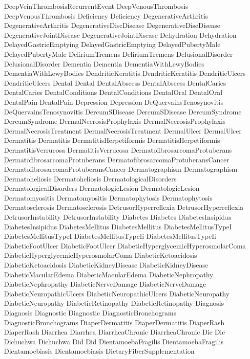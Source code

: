  DeepVeinThrombosisRecurrentEvent
 DeepVenousThrombosis
 DeepVenousThrombosis
 Deficiency
 Deficiency
 DegenerativeArthritis
 DegenerativeArthritis
 DegenerativeDiscDisease
 DegenerativeDiscDisease
 DegenerativeJointDisease
 DegenerativeJointDisease
 Dehydration
 Dehydration
 DelayedGastricEmptying
 DelayedGastricEmptying
 DelayedPubertyMale
 DelayedPubertyMale
 DeliriumTremens
 DeliriumTremens
 DelusionalDisorder
 DelusionalDisorder
 Dementia
 Dementia
 DementiaWithLewyBodies
 DementiaWithLewyBodies
 DendriticKeratitis
 DendriticKeratitis
 DendriticUlcers
 DendriticUlcers
 Dental
 Dental
 DentalAbscess
 DentalAbscess
 DentalCaries
 DentalCaries
 DentalConditions
 DentalConditions
 DentalOral
 DentalOral
 DentalPain
 DentalPain
 Depression
 Depression
 DeQuervainsTenosynovitis
 DeQuervainsTenosynovitis
 DercumSDisease
 DercumSDisease
 DercumSyndrome
 DercumSyndrome
 DermalNecrosisProphylaxis
 DermalNecrosisProphylaxis
 DermalNecrosisTreatment
 DermalNecrosisTreatment
 DermalUlcer
 DermalUlcer
 Dermatitis
 Dermatitis
 DermatitisHerpetiformis
 DermatitisHerpetiformis
 DermatitisVerrucosa
 DermatitisVerrucosa
 DermatofibrosarcomaProtuberans
 DermatofibrosarcomaProtuberans
 DermatofibrosarcomaProtuberansCancer
 DermatofibrosarcomaProtuberansCancer
 Dermatographism
 Dermatographism
 Dermatoheliosis
 Dermatoheliosis
 DermatologicalDisorders
 DermatologicalDisorders
 DermatologicLesion
 DermatologicLesion
 Dermatomyositis
 Dermatomyositis
 Dermatophytosis
 Dermatophytosis
 Dermatosclerosis
 Dermatosclerosis
 DetrusorHyperreflexia
 DetrusorHyperreflexia
 DetrusorInstability
 DetrusorInstability
 Diabetes
 Diabetes
 DiabetesInsipidus
 DiabetesInsipidus
 DiabetesMellitus
 DiabetesMellitus
 DiabetesMellitusTypeI
 DiabetesMellitusTypeI
 DiabetesMellitusTypeIi
 DiabetesMellitusTypeIi
 DiabeticFootUlcer
 DiabeticFootUlcer
 DiabeticHyperglycemicHyperosmolarComa
 DiabeticHyperglycemicHyperosmolarComa
 DiabeticKetoacidosis
 DiabeticKetoacidosis
 DiabeticKidneyDisease
 DiabeticKidneyDisease
 DiabeticMacularEdema
 DiabeticMacularEdema
 DiabeticNephropathy
 DiabeticNephropathy
 DiabeticNerveDamage
 DiabeticNerveDamage
 DiabeticNeuropathicUlcers
 DiabeticNeuropathicUlcers
 DiabeticNeuropathy
 DiabeticNeuropathy
 DiabeticRetinopathy
 DiabeticRetinopathy
 Diagnosis
 Diagnosis
 Diagnostic
 Diagnostic
 DiagnosticBronchograms
 DiagnosticBronchograms
 DiaperDermatitis
 DiaperDermatitis
 DiaperRash
 DiaperRash
 Diarrhea
 Diarrhea
 DiarrheaChronic
 DiarrheaChronic
 Dic
 Dic
 Dichuchwa
 Dichuchwa
 Did
 Did
 DientamoebaFragilis
 DientamoebaFragilis
 Dientamoebiasis
 Dientamoebiasis
 DietaryFiberSupplementation
